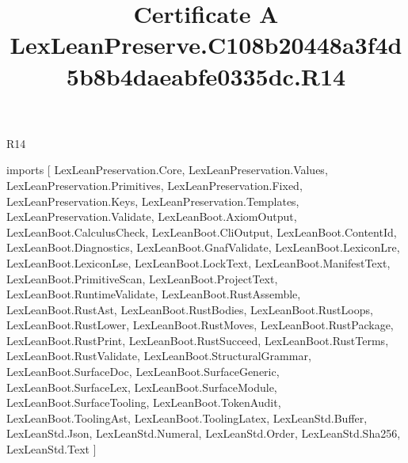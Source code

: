 \begin{lexlean}{R14}
\title{Certificate A LexLeanPreserve.C108b20448a3f4d5b8b4daeabfe0335dc.R14}
\begin{coremodule}
imports [
  LexLeanPreservation.Core,
  LexLeanPreservation.Values,
  LexLeanPreservation.Primitives,
  LexLeanPreservation.Fixed,
  LexLeanPreservation.Keys,
  LexLeanPreservation.Templates,
  LexLeanPreservation.Validate,
  LexLeanBoot.AxiomOutput,
  LexLeanBoot.CalculusCheck,
  LexLeanBoot.CliOutput,
  LexLeanBoot.ContentId,
  LexLeanBoot.Diagnostics,
  LexLeanBoot.GnafValidate,
  LexLeanBoot.LexiconLre,
  LexLeanBoot.LexiconLse,
  LexLeanBoot.LockText,
  LexLeanBoot.ManifestText,
  LexLeanBoot.PrimitiveScan,
  LexLeanBoot.ProjectText,
  LexLeanBoot.RuntimeValidate,
  LexLeanBoot.RustAssemble,
  LexLeanBoot.RustAst,
  LexLeanBoot.RustBodies,
  LexLeanBoot.RustLoops,
  LexLeanBoot.RustLower,
  LexLeanBoot.RustMoves,
  LexLeanBoot.RustPackage,
  LexLeanBoot.RustPrint,
  LexLeanBoot.RustSucceed,
  LexLeanBoot.RustTerms,
  LexLeanBoot.RustValidate,
  LexLeanBoot.StructuralGrammar,
  LexLeanBoot.SurfaceDoc,
  LexLeanBoot.SurfaceGeneric,
  LexLeanBoot.SurfaceLex,
  LexLeanBoot.SurfaceModule,
  LexLeanBoot.SurfaceTooling,
  LexLeanBoot.TokenAudit,
  LexLeanBoot.ToolingAst,
  LexLeanBoot.ToolingLatex,
  LexLeanStd.Buffer,
  LexLeanStd.Json,
  LexLeanStd.Numeral,
  LexLeanStd.Order,
  LexLeanStd.Sha256,
  LexLeanStd.Text
]


\end{coremodule}
\end{lexlean}
